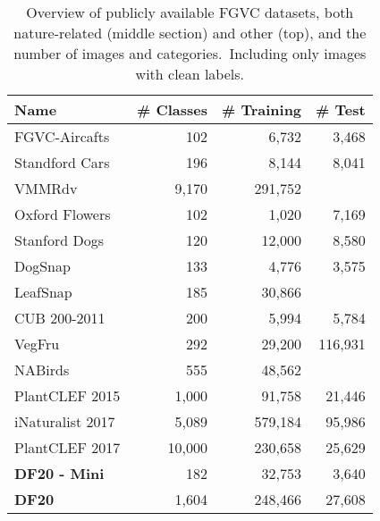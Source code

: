 \documentclass[10pt,twocolumn,letterpaper]{article}
\begin{document}
\begin{table}[!t]
\begin{center}
\renewcommand{\arraystretch}{1.1}
\setlength{\tabcolsep}{0.4em}
\begin{tabular}{|l|r|r|r|}
\hline
Name & \# Classes & \# Training & \# Test \\
\hline
FGVC-Aircafts\,\cite{aircafts}              &  102   &  6,732  &  3,468   \\
Standford Cars\,\cite{dataset-Cars}          &  196   &  8,144  &  8,041   \\
VMMRdv\,\cite{vmmrdb}                        &  9,170    &  291,752  &     \\
\hline
Oxford Flowers\,\cite{dataset-flower}              &    102 &   1,020 &   7,169  \\
Stanford Dogs\,\cite{dogsnap_dataset}              &    120 &  12,000 &   8,580  \\
DogSnap\,\cite{dogsnap_dataset}                    &    133 &   4,776 &   3,575  \\
LeafSnap\,\cite{leafsnap}                          &    185 &  30,866 &  \\
CUB 200-2011\,\cite{dataset-CUBS}                  &    200 &   5,994 &    5,784 \\
VegFru\,\cite{vegfru_dataset}                      &    292 &  29,200 & 116,931  \\
NABirds\,\cite{nabirds_dataset}                    &    555 &  48,562 &  \\
PlantCLEF 2015\,\cite{plantclef2015}               &  1,000 &  91,758 &  21,446  \\
iNaturalist 2017\,\cite{inaturalist2017}           &  5,089 & 579,184 &  95,986  \\
PlantCLEF 2017{}\,\cite{plantclef2017} & 10,000 & 230,658 &  25,629  \\
\hline \hline
\textbf{DF20 - Mini}        &    182 &  32,753 &   3,640  \\
\textbf{DF20}               &  1,604 & 248,466 &  27,608  \\
\hline
\end{tabular}
\end{center}
\caption{Overview of publicly available FGVC datasets, both nature-related (middle section) and other (top), and the number of images and categories. {}\,Including only images with clean labels.}
\label{table:fgvc_datasets}
\end{table}
\end{document}
